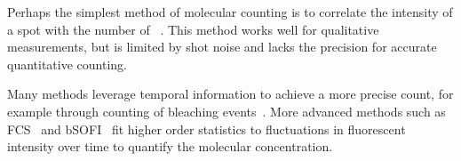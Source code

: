 %
%


%
Perhaps the simplest method of molecular counting is to correlate the intensity 
of a spot with the number of \smallobjects~\citep{schmied_2012,
tolar_2005}. This method works well for qualitative measurements, but is limited by 
shot noise and lacks the precision for accurate quantitative counting.
%

%
Many methods leverage temporal information to achieve a more precise count, 
for example through counting of bleaching events~\citep{ulbrich_2007,
jain_2011,hummert_2021, garry_bayesian_2020}.
  More advanced methods such as FCS~\citep{otsuka_2023,wachsmuth_2015,politi_2018} and 
  bSOFI~\citep{geissbuehler_2012} fit higher order statistics to fluctuations
  in fluorescent intensity over time to quantify the molecular concentration.


